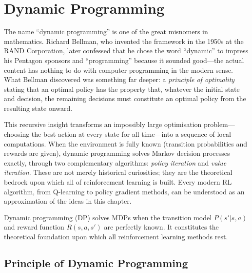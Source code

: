 \chapter{Dynamic Programming}
\label{ch:dynamic_programming}

The name ``dynamic programming'' is one of the great misnomers in mathematics. Richard Bellman, who invented the framework in the 1950s at the RAND Corporation, later confessed that he chose the word ``dynamic'' to impress his Pentagon sponsors and ``programming'' because it sounded good---the actual content has nothing to do with computer programming in the modern sense. What Bellman discovered was something far deeper: a \emph{principle of optimality} stating that an optimal policy has the property that, whatever the initial state and decision, the remaining decisions must constitute an optimal policy from the resulting state onward.

This recursive insight transforms an impossibly large optimisation problem---choosing the best action at every state for all time---into a sequence of local computations. When the environment is fully known (transition probabilities and rewards are given), dynamic programming solves Markov decision processes exactly, through two complementary algorithms: \emph{policy iteration} and \emph{value iteration}. These are not merely historical curiosities; they are the theoretical bedrock upon which all of reinforcement learning is built. Every modern RL algorithm, from Q-learning to policy gradient methods, can be understood as an approximation of the ideas in this chapter.

\begin{intuition}
Dynamic programming (DP) solves MDPs when the transition model $P(s'|s,a)$ and
reward function $R(s,a,s')$ are perfectly known. It constitutes the theoretical
foundation upon which all reinforcement learning methods rest.
\end{intuition}

\section{Principle of Dynamic Programming}

